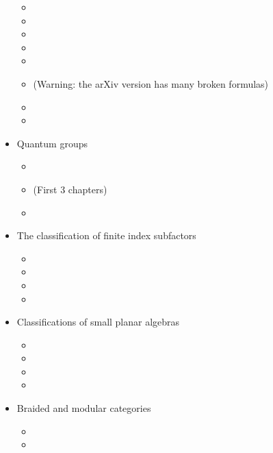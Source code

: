 \documentclass[12pt]{amsart}
\begin{document}
\begin{itemize}
\begin{itemize}
  \item {}
  \item {}
  \item {}
  \item {}
  \item {}
  \item {} (Warning: the arXiv version has many broken formulas)
  \item {}
  \item {}
  \end{itemize}
\item Quantum groups
  \begin{itemize}
  \item {}
  \item {} (First 3 chapters)
  \item {}
  \end{itemize}
\item The classification of finite index subfactors
  \begin{itemize}
  \item {}
  \item {}
  \item {}
  \item {}
  \end{itemize}
\item Classifications of small planar algebras
  \begin{itemize}
   \item {}
   \item {}
   \item {}
   \item {}
  \end{itemize}
\item Braided and modular categories
  \begin{itemize}
    \item {}
    \item {}
  \end{itemize}
\end{itemize}





\end{document}
